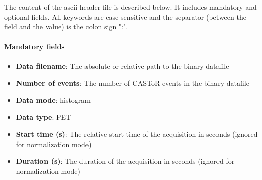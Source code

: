 \documentclass[a4paper, 11pt]{article}
\begin{document}
The content of the ascii header file is described below. It includes mandatory and optional fields. All keywords are case sensitive and the
separator (between the field and the value) is the colon sign ":".

\paragraph{Mandatory fields}
\begin{itemize}
  \item \textbf{Data filename}: The absolute or relative path to the binary datafile
  \item \textbf{Number of events}: The number of CASToR events in the binary datafile
  \item \textbf{Data mode}: histogram
  \item \textbf{Data type}: PET
  \item \textbf{Start time (s)}: The relative start time of the acquisition in seconds (ignored for normalization mode)
  \item \textbf{Duration (s)}: The duration of the acquisition in seconds (ignored for normalization mode)
\end{itemize}
\end{document}
